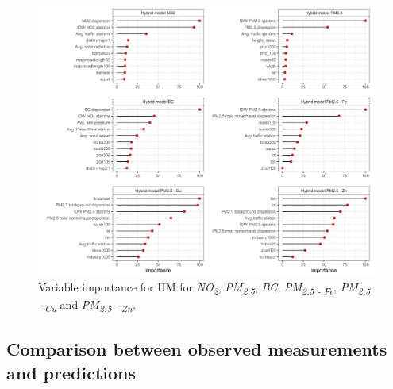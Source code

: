 \documentclass{article}
\begin{document}
\captionsetup[figure]{skip=6pt}
\begin{figure}[!htb]
\includegraphics[width=1.0\textwidth]{figures/fig_HM_allmodels_importance_v2.png}
\caption{Variable importance for HM for \textit{NO\textsubscript{2}}, \textit{PM\textsubscript{2.5}}, \textit{BC}, \textit{PM\textsubscript{2.5 - Fe}}, \textit{PM\textsubscript{2.5 - Cu}} and \textit{PM\textsubscript{2.5 - Zn}.}}
\label{fig2}
\end{figure}

\newpage

\subsection{Comparison between observed measurements and predictions}
\end{document}
